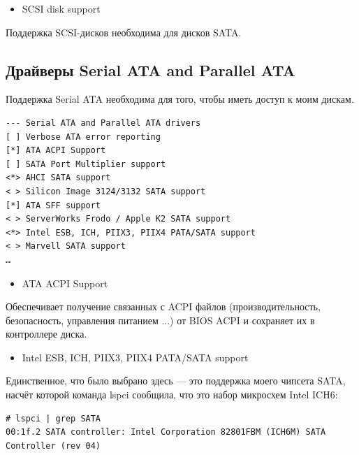 \documentclass[10pt]{book}
\begin{document}
\begin{itemize}
\item SCSI disk support                   
\end{itemize}

Поддержка SCSI-дисков необходима для дисков SATA.

\subsection{Драйверы Serial ATA and Parallel ATA}

Поддержка Serial ATA необходима для того, чтобы иметь доступ к моим дискам.

\vspace{3mm}
\begin{tcolorbox}[colback=gray!14!white, colframe=blue!75!blue]
\begin{lstlisting}
--- Serial ATA and Parallel ATA drivers
[ ] Verbose ATA error reporting
[*] ATA ACPI Support
[ ] SATA Port Multiplier support
<*> AHCI SATA support
< > Silicon Image 3124/3132 SATA support
[*] ATA SFF support
< > ServerWorks Frodo / Apple K2 SATA support
<*> Intel ESB, ICH, PIIX3, PIIX4 PATA/SATA support
< > Marvell SATA support
…
\end{lstlisting}
\end{tcolorbox}

\begin{itemize}
\item ATA ACPI Support                  
\end{itemize}

Обеспечивает получение связанных с ACPI файлов (производительность, безопасность, управления питанием ...) от BIOS ACPI и сохраняет их в контроллере диска.

\begin{itemize}
\item Intel ESB, ICH, PIIX3, PIIX4 PATA/SATA support
\end{itemize}

Единственное, что было выбрано здесь — это поддержка моего чипсета SATA, насчёт которой команда lspci сообщила, что это набор микросхем Intel ICH6:

\vspace{3mm}
\begin{tcolorbox}
\begin{lstlisting}
# lspci | grep SATA
00:1f.2 SATA controller: Intel Corporation 82801FBM (ICH6M) SATA Controller (rev 04)
\end{lstlisting}
\end{tcolorbox}
\end{document}
